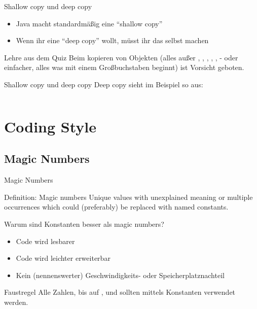\documentclass[usepdftitle=false,hyperref={pdfpagelabels=false}]{beamer}
\begin{document}
\begin{frame}{Shallow copy und deep copy}
    \begin{itemize}
        \item Java macht standardmäßig eine "`shallow copy"'
        \item Wenn ihr eine "`deep copy"' wollt, müsst ihr das selbst machen
    \end{itemize}
    \begin{alertblock}{Lehre aus dem Quiz}
        Beim kopieren von Objekten (alles außer , ,
        , , ,  -
        oder einfacher, alles was mit einem Großbuchstaben beginnt) 
        ist Vorsicht geboten.
    \end{alertblock}
\end{frame}

\begin{frame}{Shallow copy und deep copy}
    Deep copy sieht im Beispiel so aus:
    \inputminted[linenos=true, numbersep=5pt, tabsize=4, fontsize=\tiny, label=QuizArray.java, frame=lines]{java}{QuizArray-solution.java}
\end{frame}

\section{Coding Style}
\subsection{Magic Numbers}
\begin{frame}{Magic Numbers}
    \begin{alertblock}{Definition: Magic numbers}
        Unique values with unexplained meaning or multiple occurrences 
        which could (preferably) be replaced with named constants.
    \end{alertblock}

    Warum sind Konstanten besser als magic numbers?
    \begin{itemize}
        \item Code wird lesbarer
        \item Code wird leichter erweiterbar
        \item Kein (nennenswerter) Geschwindigkeits- oder Speicherplatznachteil
    \end{itemize}

    \begin{block}{Faustregel}
        Alle Zahlen, bis auf ,  und 
        sollten mittels Konstanten verwendet werden.
    \end{block}
\end{frame}
\end{document}
